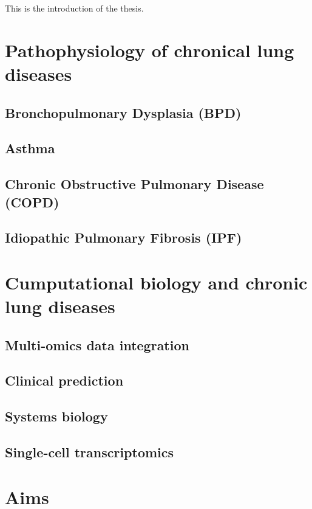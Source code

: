 This is the introduction of the thesis.

\section{Pathophysiology of chronical lung diseases}
    \subsection{Bronchopulmonary Dysplasia (BPD)}
    \subsection{Asthma}
    \subsection{Chronic Obstructive Pulmonary Disease (COPD)}
    \subsection{Idiopathic Pulmonary Fibrosis (IPF)}

\section{Cumputational biology and chronic lung diseases}
    \subsection{Multi-omics data integration}
    \subsection{Clinical prediction}
    \subsection{Systems biology}
    \subsection{Single-cell transcriptomics}
    
\section{Aims}
